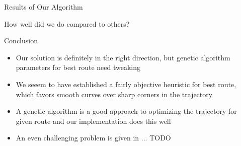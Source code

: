 \documentclass[final,t]{beamer}
\begin{document}
\begin{frame}{}
\begin{columns}[t]
\begin{column}{.305\linewidth}
    \end{column}

    
    \begin{column}{.305\linewidth}

      \begin{block}{Results of Our Algorithm}
        
        How well did we do compared to others?
      \end{block}
      
  
        
                
      \begin{block}{Conclusion}
        \begin{itemize}
        \item Our solution is definitely in the right direction, but genetic algorithm parameters for best route need tweaking
        \item We seeem to have established a fairly objective heuristic for best route, which favors smooth curves over sharp corners in the trajectory
        \item A genetic algorithm is a good approach to optimizing the trajectory for given route and our implementation does this well
        \item An even challenging problem is given in ... TODO
        \end{itemize}
        \vspace{-1ex}
      \end{block}

    \end{column}
  \end{columns}
\end{frame}
\end{document}
